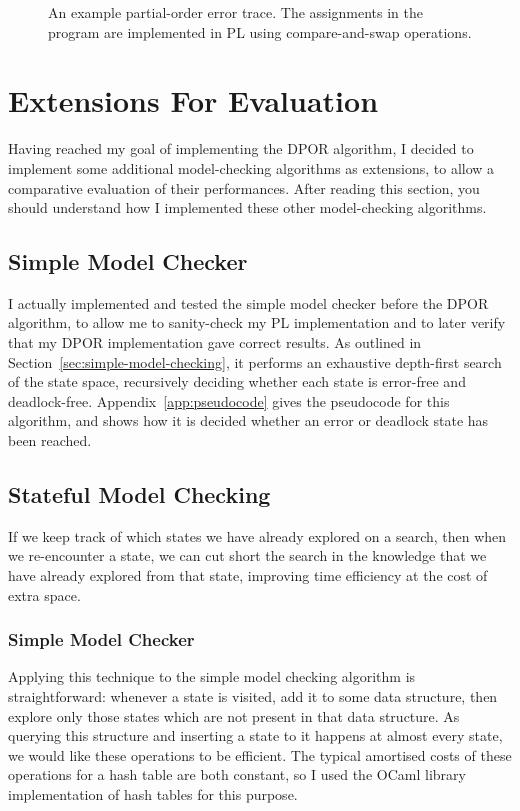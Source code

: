 \documentclass[12pt,a4paper,twoside,openright]{report}
\begin{document}
\begin{figure}
\begin{subfigure}{0.5\textwidth}
	\end{subfigure}
	\caption[An example partial-order
	error trace.]{An example partial-order
		error trace. The assignments in
		the program are implemented in PL
		using compare-and-swap operations.}
	\label{fig:trace-example}
\end{figure}

\section{Extensions For Evaluation}
Having reached my goal of implementing
the DPOR algorithm, I decided to
implement some additional model-checking
algorithms as extensions, to allow a
comparative evaluation of their
performances. After reading this
section, you should understand how
I implemented these other model-checking
algorithms.

\subsection{Simple Model Checker}
I actually implemented and tested
the simple
model checker before the DPOR
algorithm, to allow me to
sanity-check my PL implementation
and to later verify
that my DPOR implementation
gave correct results.
As outlined in
Section~\ref{sec:simple-model-checking}, it
performs an exhaustive depth-first
search of the state space,
recursively deciding whether each
state is error-free
and deadlock-free.
Appendix~\ref{app:pseudocode} gives
the pseudocode for this algorithm,
and shows how it is decided whether
an error or deadlock state has been reached.

\subsection{Stateful Model Checking}
If we keep track of which states we have
already explored on a search, then when
we re-encounter a state, we can cut short
the search in the knowledge that we have
already explored from that state, improving
time efficiency at the cost of extra space.

\subsubsection{Simple Model Checker}

Applying this technique to the simple model
checking algorithm is straightforward: whenever
a state is visited, add it to some data structure,
then explore only those states which are not
present in that data structure. As querying
this structure and inserting a state to it
happens at almost every state, we would like these
operations to be efficient. The typical amortised costs
of these operations for a hash table are both
constant, so I used the OCaml library implementation
of hash tables for this purpose.
\end{document}

